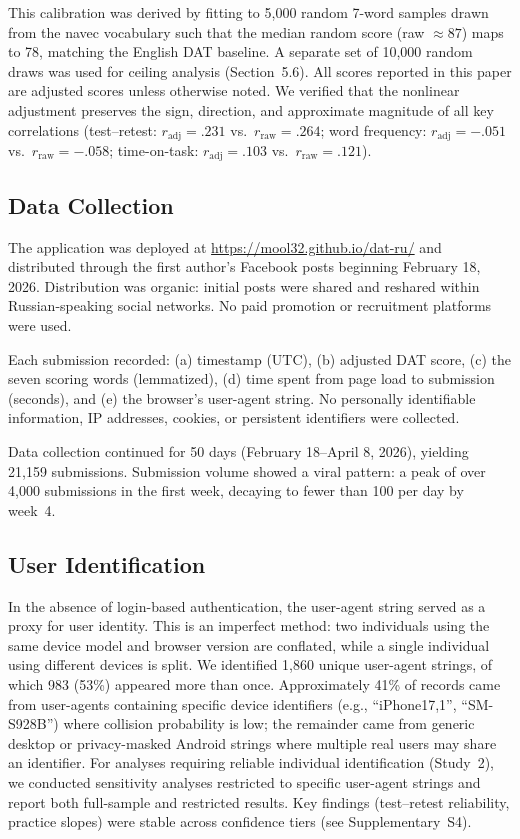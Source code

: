 \documentclass[12pt]{article}
\begin{document}
This calibration was derived by fitting to 5,000 random 7-word samples drawn from the navec vocabulary such that the median random score (raw $\approx 87$) maps to 78, matching the English DAT baseline. A separate set of 10,000 random draws was used for ceiling analysis (Section~5.6). All scores reported in this paper are adjusted scores unless otherwise noted. We verified that the nonlinear adjustment preserves the sign, direction, and approximate magnitude of all key correlations (test--retest: $r_{\text{adj}} = .231$ vs.\ $r_{\text{raw}} = .264$; word frequency: $r_{\text{adj}} = -.051$ vs.\ $r_{\text{raw}} = -.058$; time-on-task: $r_{\text{adj}} = .103$ vs.\ $r_{\text{raw}} = .121$).

\subsection{Data Collection}

The application was deployed at \url{https://mool32.github.io/dat-ru/} and distributed through the first author's Facebook posts beginning February 18, 2026. Distribution was organic: initial posts were shared and reshared within Russian-speaking social networks. No paid promotion or recruitment platforms were used.

Each submission recorded: (a) timestamp (UTC), (b) adjusted DAT score, (c) the seven scoring words (lemmatized), (d) time spent from page load to submission (seconds), and (e) the browser's user-agent string. No personally identifiable information, IP addresses, cookies, or persistent identifiers were collected.

Data collection continued for 50 days (February 18--April 8, 2026), yielding 21,159 submissions. Submission volume showed a viral pattern: a peak of over 4,000 submissions in the first week, decaying to fewer than 100 per day by week~4.

\subsection{User Identification}

In the absence of login-based authentication, the user-agent string served as a proxy for user identity. This is an imperfect method: two individuals using the same device model and browser version are conflated, while a single individual using different devices is split. We identified 1,860 unique user-agent strings, of which 983 (53\%) appeared more than once. Approximately 41\% of records came from user-agents containing specific device identifiers (e.g., ``iPhone17,1'', ``SM-S928B'') where collision probability is low; the remainder came from generic desktop or privacy-masked Android strings where multiple real users may share an identifier. For analyses requiring reliable individual identification (Study~2), we conducted sensitivity analyses restricted to specific user-agent strings and report both full-sample and restricted results. Key findings (test--retest reliability, practice slopes) were stable across confidence tiers (see Supplementary~S4).
\end{document}
